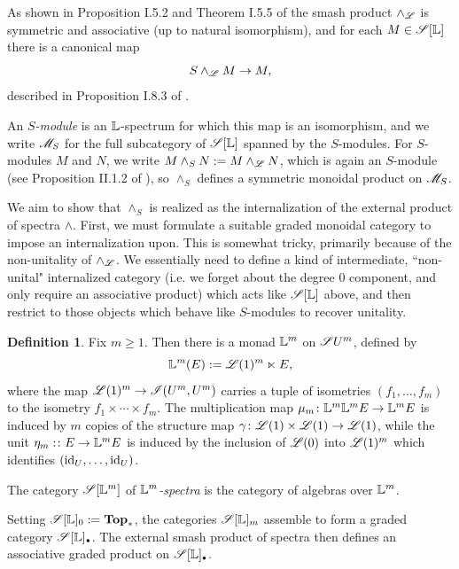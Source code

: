\documentclass[openany, amssymb, psamsfonts]{amsart}
\theoremstyle{definition}
\newtheorem{defn}{Definition}[section]
\numberwithin{equation}{section}
\begin{document}
As shown in Proposition I.5.2 and Theorem I.5.5 of \cite{EKMM} the smash product $\wedge_{\mathscr{L}}$ is symmetric and associative (up to natural isomorphism), and for each $M \in \mathscr{S} [\mathbb{L}]$ there is a canonical map
\begin{equation*}
    S \wedge_{\mathscr{L}} M \to M,
\end{equation*} described in Proposition I.8.3 of \cite{EKMM}.

An \emph{$S$-module} is an $\mathbb{L}$-spectrum for which this map is an isomorphism, and we write $\mathscr{M}_S$ for the full subcategory of $\mathscr{S}[\mathbb{L}]$ spanned by the $S$-modules. For $S$-modules $M$ and $N$, we write $M \wedge_S N := M \wedge_{\mathscr{L}} N$, which is again an $S$-module (see Proposition II.1.2 of \cite{EKMM}), so $\wedge_S$ defines a symmetric monoidal product on $\mathscr{M}_S$.

We aim to show that $\wedge_S$ is realized as the internalization of the external product of spectra $\wedge$. First, we must formulate a suitable graded monoidal category to impose an internalization upon. This is somewhat tricky, primarily because of the non-unitality of $\wedge_{\mathscr{L}}$. We essentially need to define a kind of intermediate, ``non-unital" internalized category (i.e. we forget about the degree $0$ component, and only require an associative product) which acts like $\mathscr{S}[\mathbb{L}]$ above, and then restrict to those objects which behave like $S$-modules to recover unitality.

\begin{defn}
    Fix $m \geq 1$. Then there is a monad $\mathbb{L}^m$ on $\mathscr{S} U^m$, defined by
    \begin{equation*}
        \mathbb{L}^m(E) := \mathscr{L}(1)^m \ltimes E,
    \end{equation*} where the map $\mathscr{L}(1)^m \to \mathscr{I}(U^m, U^m)$ carries a tuple of isometries $(f_1, \dots, f_m)$ to the isometry $f_1 \times \cdots \times f_m$. The multiplication map $\mu_m \colon \mathbb{L}^m \mathbb{L}^m E \to \mathbb{L}^m E$ is induced by $m$ copies of the structure map $\gamma \colon \mathscr{L}(1) \times \mathscr{L}(1) \to \mathscr{L}(1)$, while the unit $\eta_m :\colon E \to \mathbb{L}^m E$ is induced by the inclusion of $\mathscr{L}(0)$ into $\mathscr{L}(1)^m$ which identifies $(\mathrm{id}_U, \dots, \mathrm{id}_U)$.
    
    The category $\mathscr{S}[\mathbb{L}^m]$ of \emph{$\mathbb{L}^m$-spectra} is the category of algebras over $\mathbb{L}^m$.
\end{defn}

Setting $\mathscr{S}[\mathbb{L}]_0 := \textbf{\textup{Top}}_*$, the categories $\mathscr{S}[\mathbb{L}]_m$ assemble to form a graded category $\scS[\LL]_\sbull$. The external smash product of spectra then defines an associative graded product on $\scS[\LL]_\sbull$.
\end{document}
